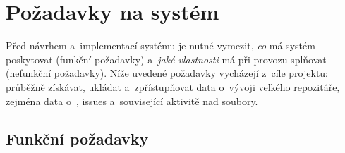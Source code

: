 \section{Požadavky na systém}
\label{sec:requirements}

Před návrhem a~implementací systému je nutné vymezit, \emph{co} má systém poskytovat (funkční požadavky) a~\emph{jaké vlastnosti} má při provozu splňovat (nefunkční požadavky). Níže uvedené požadavky vycházejí z~cíle projektu: průběžně získávat, ukládat a~zpřístupňovat data o~vývoji velkého repozitáře, zejména data o~\PR, issues a~související aktivitě nad soubory.

\subsection{Funkční požadavky}
\label{subsec:requirements:functional}

